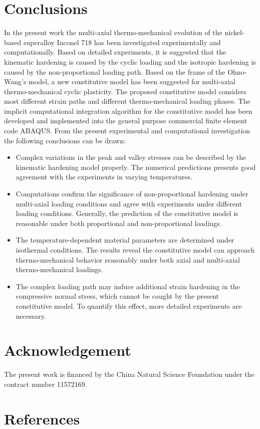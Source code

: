 \documentclass[preprint,5p,twocolumn,11pt,sort&compress]{elsarticle}
\begin{document}
\section{Conclusions}
In the present work the multi-axial thermo-mechanical evolution of the nickel-based superalloy Inconel 718 has been investigated experimentally and computationally.
Based on detailed experiments, it is suggested that the kinematic hardening is caused by the cyclic loading and the isotropic hardening is caused by the non-proportional loading path.
Based on the frame of the Ohno-Wang's model, a new constitutive model has been suggested for multi-axial thermo-mechanical cyclic plasticity.
The proposed constitutive model considers most different strain paths and different thermo-mechanical loading phases.
The implicit computational integration algorithm for the constitutive model has been developed and implemented into the general purpose commercial finite element code ABAQUS.
From the present experimental and computational investigation the following conclusions can be drawn:
\begin{itemize}

\item {Complex variations in the peak and valley stresses can be described by the kinematic hardening model properly. The numerical predictions presents good agreement with the experiments in varying temperatures.}

\item {Computations confirm the significance of non-proportional hardening under multi-axial loading conditions and agree with experiments under different loading conditions. Generally, the prediction of the constitutive model is reasonable under both proportional and non-proportional loadings.}

\item {The temperature-dependent material parameters are determined under isothermal conditions. The results reveal the constitutive model can approach thermo-mechanical behavior reasonably under both axial and multi-axial thermo-mechanical loadings.}

\item{The complex loading path may induce additional strain hardening in the compressive normal stress, which cannot be caught by the present constitutive model. To quantify this effect, more detailed experiments are necessary.}

\end{itemize}


\section*{Acknowledgement}
The present work is financed by the China Natural Science Foundation under the contract number 11572169.

\section*{References}


\end{document}
